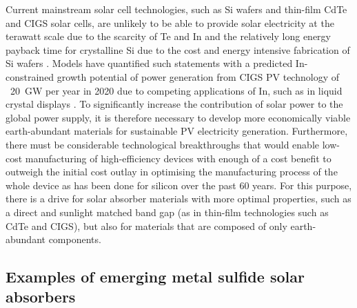 \documentclass[11pt, twoside]{report}
\begin{document}

Current mainstream solar cell technologies, such as Si wafers and thin-film CdTe and CIGS solar cells, are unlikely to be able to provide solar electricity at the terawatt scale due to the scarcity of Te and In and the relatively long energy payback time for crystalline Si due to the cost and energy intensive fabrication of Si wafers \cite{CZTS_vs_MAPI}. 
Models have quantified such statements with a predicted In-constrained growth potential of power generation from CIGS PV technology of ~\SI{20}{GW} per year in 2020 due to competing applications of In, such as in liquid crystal displays \cite{culprit_5_3}.
To significantly increase the contribution of solar power to the global power supply, it is therefore necessary to develop more economically viable earth-abundant materials for sustainable PV electricity generation. Furthermore, there must be considerable technological breakthroughs that would enable low-cost manufacturing of high-efficiency devices with enough of a cost benefit to outweigh the initial cost outlay in optimising the manufacturing process of the whole device as has been done for silicon over the past 60 years. For this purpose, there is a drive for solar absorber materials with more optimal properties, such as a direct and sunlight matched band gap (as in thin-film technologies such as CdTe and CIGS), but also for materials that are composed of only earth-abundant components.\\


\subsection{Examples of emerging metal sulfide solar absorbers}
\end{document}
